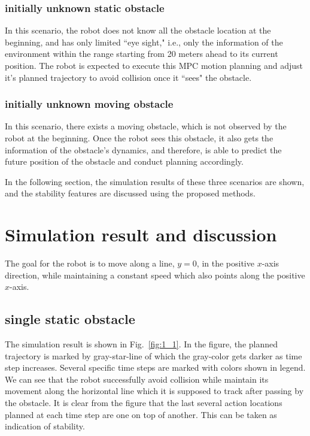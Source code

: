 \documentclass{ifacconf}
\begin{document}
\subsubsection{initially unknown static obstacle}
In this scenario, the robot does not know all the obstacle location at the beginning, and has only limited ``eye sight," i.e., only the information of the environment within the range starting from 20 meters ahead to its current position. The robot is expected to execute this MPC motion planning and adjust it's planned trajectory to avoid collision once it ``sees" the obstacle.

\subsubsection{initially unknown moving obstacle}
In this scenario, there exists a moving obstacle, which is not observed by the robot at the beginning. Once the robot sees this obstacle, it also gets the information of the obstacle's dynamics, and therefore, is able to predict the future position of the obstacle and conduct planning accordingly. 

In the following section, the simulation results of these three scenarios are shown, and the stability features are discussed using the proposed methods.



\section{Simulation result and discussion}

The goal for the robot is to move along a line, $y=0$, in the positive $x$-axis direction, while maintaining a constant speed which also points along the positive $x$-axis. 
\subsection{single static obstacle}
The simulation result is shown in Fig.~\ref{fig:1_1}. In the figure, the planned trajectory is marked by gray-star-line of which the gray-color gets darker as time step increases. Several specific time steps are marked with colors shown in legend. We can see that the robot successfully avoid collision while maintain its movement along the horizontal line which it is supposed to track after passing by the obstacle. It is clear from the figure that the last several action locations planned at each time step are one on top of another. This can be taken as indication of stability. 
\end{document}

